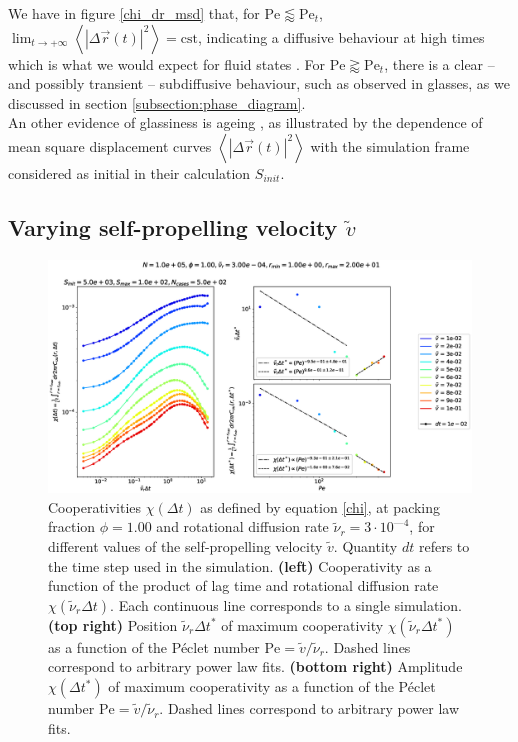 \documentclass[class=report, float=false, crop=false]{standalone}
\begin{document}
We have in figure \ref{chi_dr_msd} that, for $\text{Pe} \lessapprox \text{Pe}_t$, $\lim_{t \rightarrow +\infty} \left<|\Delta\vec{r}(t)|^2\right> = \text{cst}$, indicating a diffusive behaviour at high times which is what we would expect for fluid states \cite{binder2011glassy}. For $\text{Pe} \gtrapprox \text{Pe}_t$, there is a clear -- and possibly transient -- subdiffusive behaviour, such as observed in glasses, as we discussed in section \ref{subsection:phase_diagram}.\\

An other evidence of glassiness is ageing \cite{courtland2002direct}, as illustrated by the dependence of mean square displacement curves $\left<|\Delta\vec{r}(t)|^2\right>$ with the simulation frame considered as initial in their calculation $S_{init}$.

\subsection{Varying self-propelling velocity $\tilde{v}$}

\begin{figure}[h!]
\centering
\includegraphics[width=\textwidth]{figures/figs/intCuu_Dk8000_Rh3000_Nq1000_Io5000_Mn1000_Cn5000_RMINl1000_RMAXm2000.eps}
\caption{Cooperativities $\chi(\Delta t)$ as defined by equation \ref{chi}, at packing fraction $\phi = 1.00$ and rotational diffusion rate $\tilde{\nu}_r = 3\cdot10^{—4}$, for different values of the self-propelling velocity $\tilde{v}$. Quantity $dt$ refers to the time step used in the simulation. \textbf{(left)} Cooperativity as a function of the product of lag time and rotational diffusion rate $\chi(\tilde{\nu}_r \Delta t)$. Each continuous line corresponds to a single simulation. \textbf{(top right)} Position $\tilde{\nu}_r \Delta t^*$ of maximum cooperativity $\chi(\tilde{\nu}_r \Delta t^*)$ as a function of the P\'eclet number $\text{Pe} = \tilde{v}/\tilde{\nu}_r$. Dashed lines correspond to arbitrary power law fits. \textbf{(bottom right)} Amplitude $\chi(\Delta t^*)$ of maximum cooperativity as a function of the P\'eclet number $\text{Pe} = \tilde{v}/\tilde{\nu}_r$. Dashed lines correspond to arbitrary power law fits.}
\label{chi_v}
\end{figure}
\end{document}
